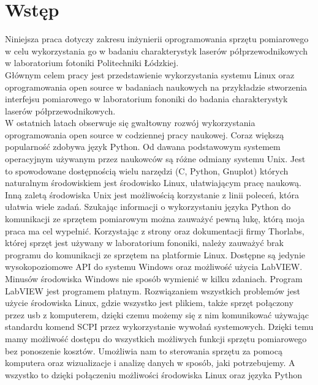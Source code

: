 \documentclass[a4paper, portrait,12pt]{report}
\begin{document}
\tableofcontents    %
\newpage

\chapter{Wstęp} \label{rozdz.wstep}
Niniejsza praca dotyczy zakresu inżynierii oprogramowania sprzętu pomiarowego w celu wykorzystania go w badaniu charakterystyk laserów półprzewodnikowych w laboratorium fotoniki Politechniki Łódzkiej. \\

Głównym celem pracy jest przedstawienie wykorzystania systemu Linux oraz oprogramowania open source w badaniach naukowych na przykładzie stworzenia interfejsu
pomiarowego w laboratorium fononiki do badania charakterystyk laserów półprzewodnikowych. \\

W ostatnich latach obserwuje się gwałtowny rozwój wykorzystania oprogramowania
open source w codziennej pracy naukowej. Coraz większą popularność zdobywa język Python. Od dawana podstawowym systemem operacyjnym używanym przez naukowców są różne odmiany systemu Unix. Jest to spowodowane dostępnością wielu narzędzi (C, Python,
Gnuplot) których naturalnym środowiskiem jest środowisko Linux, ułatwiającym pracę naukową. Inną
zaletą środowiska Unix jest możliwością korzystanie z linii poleceń, która ułatwia wiele
zadań. Szukając informacji o wykorzystaniu języka Python do komunikacji ze sprzętem pomiarowym można zauważyć pewną lukę, którą moja praca ma cel wypełnić. Korzystając
z strony oraz dokumentacji firmy Thorlabs, której sprzęt jest używany w laboratorium
fononiki, należy zauważyć brak programu do komunikacji ze sprzętem na platformie Linux.
Dostępne są jedynie wysokopoziomowe API do systemu Windows oraz możliwość użycia
LabVIEW. Minusów środowiska Windows nie sposób wymienić w kilku zdaniach. Program
LabVIEW jest programem płatnym. Rozwiązaniem wszystkich problemów jest użycie środowiska Linux, gdzie wszystko jest plikiem, także sprzęt połączony przez usb z komputerem, dzięki czemu możemy się z nim komunikować używając standardu komend SCPI przez
wykorzystanie wywołań systemowych. Dzięki temu mamy możliwość dostępu do wszystkich możliwych funkcji sprzętu pomiarowego bez ponoszenie kosztów. Umożliwia nam to
sterowania sprzętu za pomocą komputera oraz wizualizacje i analizę danych w sposób, jaki
potrzebujemy. A wszystko to dzięki połączeniu możliwości środowiska Linux oraz języka Python \\
\end{document}
